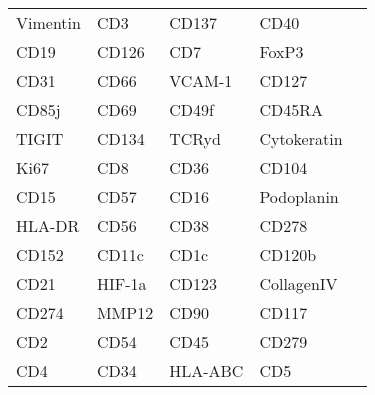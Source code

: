 \begin{tabular}{lllll}
Vimentin & CD3 & CD137 & CD40 &  \\
CD19 & CD126 & CD7 & FoxP3 &  \\
CD31 & CD66 & VCAM-1 & CD127 &  \\
CD85j & CD69 & CD49f & CD45RA &  \\
TIGIT & CD134 & TCRyd & Cytokeratin &  \\
Ki67 & CD8 & CD36 & CD104 &  \\
CD15 & CD57 & CD16 & Podoplanin &  \\
HLA-DR & CD56 & CD38 & CD278 &  \\
CD152 & CD11c & CD1c & CD120b &  \\
CD21 & HIF-1a & CD123 & CollagenIV &  \\
CD274 & MMP12 & CD90 & CD117 &  \\
CD2 & CD54 & CD45 & CD279 &  \\
CD4 & CD34 & HLA-ABC & CD5 &  \\
\end{tabular}
